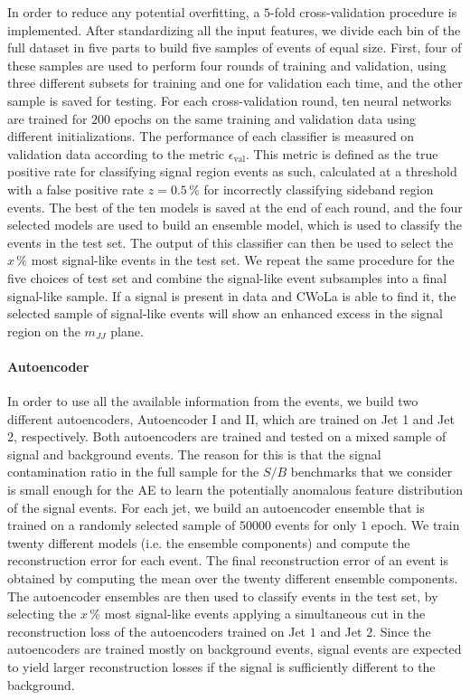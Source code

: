 \documentclass[a4paper,11pt]{article}
\begin{document}
In order to reduce any potential overfitting, a $5$-fold cross-validation procedure is implemented. After standardizing all the input features, we divide each bin of the full dataset in five parts to build five samples of events of equal size. First, four of these samples are used to perform four rounds of training and validation, using three different subsets for training and one for validation each time, and the other sample is saved for testing. For each cross-validation round, ten neural networks are trained for $200$ epochs on the same training and validation data using different initializations. The performance of each classifier is measured on validation data according to the metric $\epsilon_{\text{val}}$. This metric is defined as the true positive rate for classifying signal region events as such, calculated at a threshold with a false positive rate $z = 0.5 \, \%$ for incorrectly classifying sideband region events. The best of the ten models is saved at the end of each round, and the four selected models are used to build an ensemble model, which is used to classify the events in the test set. The output of this classifier can then be used to select the $x \, \%$ most signal-like events in the test set. We repeat the same procedure for the five choices of test set and combine the signal-like event subsamples into a final signal-like sample. If a signal is present in data and CWoLa is able to find it, the selected sample of signal-like events will show an enhanced excess in the signal region on the $m_{JJ}$ plane.


\paragraph{Autoencoder}
\label{sec:PMAE}

In order to use all the available information from the events, we build two different autoencoders, Autoencoder I and II, which are trained on Jet 1 and Jet 2, respectively. Both autoencoders are trained and tested on a mixed sample of signal and background events. The reason for this is that the signal contamination ratio in the full sample for the $S/B$ benchmarks that we consider is small enough for the AE to learn the potentially anomalous feature distribution of the signal events. For each jet, we build an autoencoder ensemble that is trained on a randomly selected sample of $50000$ events for only $1$ epoch. We train twenty different models (i.e. the ensemble components) and compute the reconstruction error for each event. The final reconstruction error of an event is obtained by computing the mean over the twenty different ensemble components. The autoencoder ensembles are then used to classify events in the test set, by selecting the $x \, \%$ most signal-like events applying a simultaneous cut in the reconstruction loss of the autoencoders trained on Jet $1$ and Jet $2$. Since the autoencoders are trained mostly on background events, signal events are expected to yield larger reconstruction losses if the signal is sufficiently different to the background.
\end{document}
